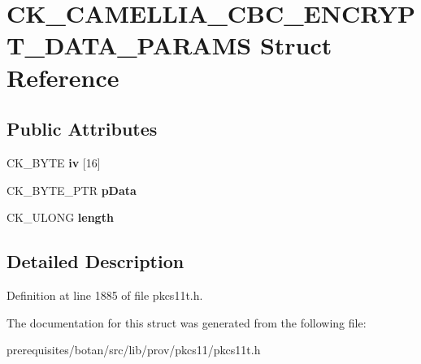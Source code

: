 \hypertarget{struct_c_k___c_a_m_e_l_l_i_a___c_b_c___e_n_c_r_y_p_t___d_a_t_a___p_a_r_a_m_s}{}\section{C\+K\+\_\+\+C\+A\+M\+E\+L\+L\+I\+A\+\_\+\+C\+B\+C\+\_\+\+E\+N\+C\+R\+Y\+P\+T\+\_\+\+D\+A\+T\+A\+\_\+\+P\+A\+R\+A\+MS Struct Reference}
\label{struct_c_k___c_a_m_e_l_l_i_a___c_b_c___e_n_c_r_y_p_t___d_a_t_a___p_a_r_a_m_s}
\subsection*{Public Attributes}
\begin{DoxyCompactItemize}
\item 
\mbox{\label{struct_c_k___c_a_m_e_l_l_i_a___c_b_c___e_n_c_r_y_p_t___d_a_t_a___p_a_r_a_m_s_afbe12e15647428859ca18f31fd201f7b}} 
C\+K\+\_\+\+B\+Y\+TE {\bfseries iv} \mbox{[}16\mbox{]}
\item 
\mbox{\label{struct_c_k___c_a_m_e_l_l_i_a___c_b_c___e_n_c_r_y_p_t___d_a_t_a___p_a_r_a_m_s_a0477988fd2fedaaba95fe46d0a3642d2}} 
C\+K\+\_\+\+B\+Y\+T\+E\+\_\+\+P\+TR {\bfseries p\+Data}
\item 
\mbox{\label{struct_c_k___c_a_m_e_l_l_i_a___c_b_c___e_n_c_r_y_p_t___d_a_t_a___p_a_r_a_m_s_afd4cbb1fa44f9e278682c8c6425ee080}} 
C\+K\+\_\+\+U\+L\+O\+NG {\bfseries length}
\end{DoxyCompactItemize}


\subsection{Detailed Description}


Definition at line 1885 of file pkcs11t.\+h.



The documentation for this struct was generated from the following file\+:\begin{DoxyCompactItemize}
\item 
prerequisites/botan/src/lib/prov/pkcs11/pkcs11t.\+h\end{DoxyCompactItemize}
